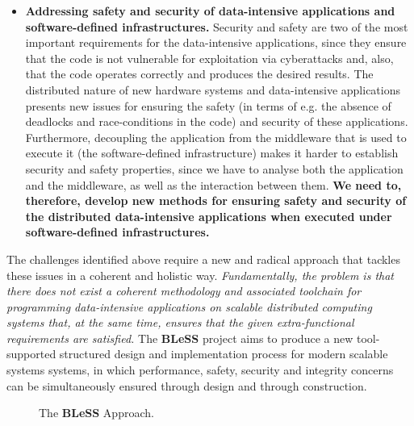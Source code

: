 \documentclass[a4paper,11pt]{article}
\newcommand{\project}[1]{\textbf{#1}\xspace}
\newcommand{\BLESS}{\project{BLeSS}}
\newcommand{\TheProject}{\BLESS}
\begin{document}
\begin{itemize}
\item \textbf{Addressing safety and security of data-intensive
  applications and software-defined infrastructures.}  Security and
  safety are two of the most important requirements for the
  data-intensive applications, since they ensure that the code is not
  vulnerable for exploitation via cyberattacks and, also, that the code
  operates correctly and produces the desired results. The distributed nature
  of new hardware systems and data-intensive applications presents
  new issues for ensuring the safety (in terms of e.g. the absence of deadlocks and
  race-conditions in the code) and security of these
  applications. Furthermore, decoupling the application from the
  middleware that is used to execute it (the software-defined infrastructure) makes it
  harder to establish security and safety properties, since we have to analyse both
  the application and the middleware, as well as the interaction between them.
  \textbf{We need to, therefore, develop new methods for
    ensuring safety and security of the distributed data-intensive
    applications when executed under software-defined infrastructures.}



\end{itemize}


The challenges identified above require a new and radical
approach that tackles these issues in a coherent and
holistic way. 
\emph{Fundamentally, the problem is that there does not exist a coherent methodology and associated toolchain for programming data-intensive applications on scalable distributed computing systems that, at the same time, ensures that  the
given extra-functional requirements are satisfied.}
The \TheProject{} project aims to produce a new
tool-supported structured design and implementation process for modern scalable systems
systems, in which performance, safety, security
and integrity concerns can be simultaneously ensured through design and through construction. %

\clearpage
 \begin{figure}[tp]
 \begin{center}
 \end{center}
\vspace{-1cm}
 \caption{The \TheProject{} Approach.}
 \label{fig:approach}
 \end{figure}
\end{document}

